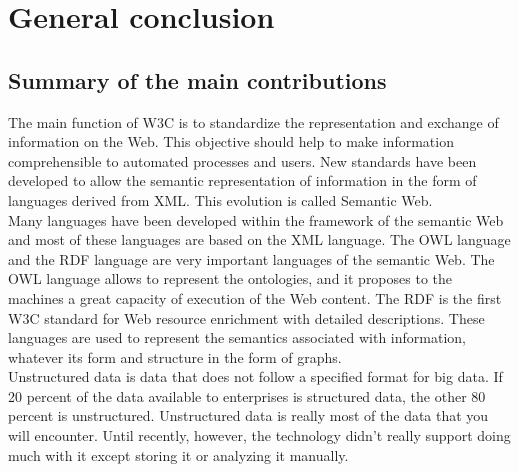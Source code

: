 \chapter*{General conclusion}
\section*{Summary of the main contributions}

The main function of W3C is to standardize the representation and exchange of information on the Web. This objective should help to make information comprehensible to automated processes and users. New standards have been developed to allow the semantic representation of information in the form of languages derived from XML. This evolution is called Semantic Web. \\

Many languages have been developed within the framework of the semantic Web and most of these languages are based on the XML language. The OWL language and the RDF language are very important languages of the semantic Web. The OWL language allows to represent the ontologies, and it proposes to the machines a great capacity of execution of the Web content. The RDF is the first W3C standard for Web resource enrichment with detailed descriptions. These languages are used to represent the semantics associated with information, whatever its form and structure in the form of graphs. \\

Unstructured data is data that does not follow a specified format for big data. If 20 percent of the data available to enterprises is structured data, the other 80 percent is unstructured. Unstructured data is really most of the data that you will encounter. Until recently, however, the technology didn’t really support doing much with it except storing it or analyzing it manually. \\


